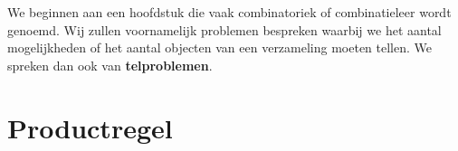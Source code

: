\documentclass[12pt,twoside]{article}
\begin{document}
\begin{theorie}
\thispagestyle{empty}
\newpage
\thispagestyle{empty}
\tableofcontents
\newpage
\clearpage
{}
\pagestyle{fancy}
\lhead{}

\onehalfspacing


We beginnen aan een hoofdstuk die vaak combinatoriek of combinatieleer wordt genoemd. Wij zullen voornamelijk problemen bespreken waarbij we het aantal mogelijkheden of het aantal objecten van een verzameling moeten tellen. We spreken dan ook van {\bf telproblemen}.

\end{theorie}

\section{Productregel}
\end{document}
